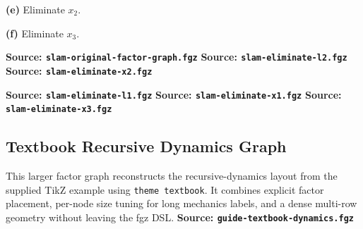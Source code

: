 \documentclass{article}
\newcommand{\fgzAdvancedScale}{0.62}
\newcommand{\fgzAdvancedPanel}[1]{\scalebox{\fgzAdvancedScale}{}}
\begin{document}
\medskip

\begin{samepage}
  \noindent
  \begin{minipage}[t]{0.48\textwidth}
    \centering
    \fgzAdvancedPanel{slam-eliminate-x2.fgz.tex}

    \smallskip
    \textbf{(e)} Eliminate $x_2$.
  \end{minipage}\hfill
  \begin{minipage}[t]{0.48\textwidth}
    \centering
    \fgzAdvancedPanel{slam-eliminate-x3.fgz.tex}

    \smallskip
    \textbf{(f)} Eliminate $x_3$.
  \end{minipage}
\end{samepage}

\begin{samepage}
  \noindent
  \begin{minipage}[t]{0.48\textwidth}
    \textbf{Source: \texttt{slam-original-factor-graph.fgz}}
    \textbf{Source: \texttt{slam-eliminate-l2.fgz}}
    \textbf{Source: \texttt{slam-eliminate-x2.fgz}}
  \end{minipage}\hfill
  \begin{minipage}[t]{0.48\textwidth}
    \textbf{Source: \texttt{slam-eliminate-l1.fgz}}
    \textbf{Source: \texttt{slam-eliminate-x1.fgz}}
    \textbf{Source: \texttt{slam-eliminate-x3.fgz}}
  \end{minipage}
\end{samepage}

\clearpage
\subsection{Textbook Recursive Dynamics Graph}
This larger factor graph reconstructs the recursive-dynamics layout from the supplied
TikZ example using \texttt{theme textbook}. It combines explicit factor placement,
per-node size tuning for long mechanics labels, and a dense multi-row geometry without
leaving the fgz DSL. \textbf{Source: \texttt{guide-textbook-dynamics.fgz}}
\end{document}
